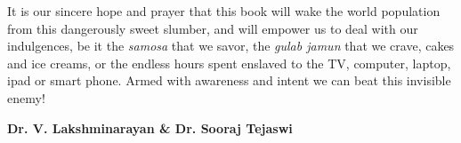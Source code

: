 It is our sincere hope and prayer that this book will wake the world population from this dangerously sweet slumber, and will empower us to deal with our indulgences, be it the \textit{samosa} that we savor, the \textit{gulab jamun} that we crave, cakes and ice creams, or the endless hours spent enslaved to the TV, computer, laptop, ipad or smart phone. Armed with awareness and intent we can beat this invisible enemy!

\begin{flushright}
\textbf{Dr. V. Lakshminarayan \& Dr. Sooraj Tejaswi}
\end{flushright}

